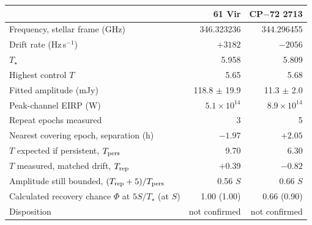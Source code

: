 \begin{tabular}{@{}>{\raggedright\arraybackslash}p{}@{~~}r@{~~}r@{}}
\hline
 & 61 Vir & CP$-$72 2713 \\
\hline
Frequency, stellar frame (GHz) & 346.323236 & 344.296455 \\
Drift rate (Hz\,s$^{-1}$) & $+3182$ & $-2056$ \\
$T_\star$ & 5.958 & 5.809 \\
Highest control $T$ & 5.65 & 5.68 \\
Fitted amplitude (mJy) & 118.8 $\pm$ 19.9 & 11.3 $\pm$ 2.0 \\
Peak-channel EIRP (W) & $5.1 \times 10^{14}$ & $8.9 \times 10^{14}$ \\
Repeat epochs measured & 3 & 5 \\
Nearest covering epoch, separation (h) & $-1.97$ & $+2.05$ \\
$T$ expected if persistent, $T_{\rm pers}$ & 9.70 & 6.30 \\
$T$ measured, matched drift, $T_{\rm rep}$ & $+0.39$ & $-0.82$ \\
Amplitude still bounded, $(T_{\rm rep}+5)/T_{\rm pers}$ & 0.56 $S$ & 0.66 $S$ \\
Calculated recovery chance $\Phi$ at $5S/T_\star$ (at $S$) & 1.00 (1.00) & 0.66 (0.90) \\
Disposition & not confirmed & not confirmed \\
\hline
\end{tabular}
